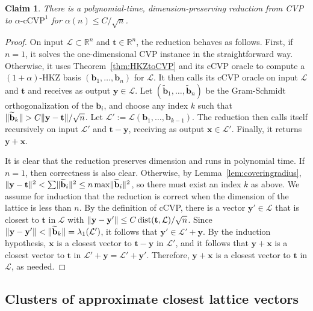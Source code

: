 \documentclass[11pt]{article}
\newtheorem{claim}[theorem]{Claim}
\newcommand{\R}{\ensuremath{\mathbb{R}}}
\renewcommand{\vec}[1]{\ensuremath{\mathbf{#1}}}
\newcommand{\problem}[1]{\mbox{#1}\xspace}
\newcommand{\lat}{\mathcal{L}}
\newcommand{\gs}[1]{\ensuremath{\widetilde{#1}}}
\DeclareMathOperator{\dist}{dist}
\DeclarePairedDelimiter\length{\lVert}{\rVert}
\begin{document}
\begin{claim}
\label{clm:simplenCVPreduction}
There is a polynomial-time, dimension-preserving reduction from \problem{CVP} to $\alpha\text{-}\problem{cCVP}^1$ for $\alpha(n) \leq C/\sqrt{n}$.
\end{claim}
\begin{proof}
On input $\lat \subset \R^n$ and $\vec{t} \in \R^n$, the reduction behaves as follows. First, if $n =1$, it solves the one-dimensional CVP instance in the straightforward way. Otherwise, it uses Theorem~\ref{thm:HKZtoCVP} and its cCVP oracle to compute a $(1+\alpha)$-HKZ basis $(\vec{b}_1, \ldots, \vec{b}_n)$ for $\lat$. It then calls its cCVP oracle on input $\lat$ and $\vec{t}$ and receives as output $\vec{y} \in \lat$. Let $(\gs{\vec{b}}_1, \ldots, \gs{\vec{b}}_n)$ be the Gram-Schmidt orthogonalization of the $\vec{b}_i$, and choose any index $k$ such that $ \length{\gs{\vec{b}}_k} > C\length{\vec{y} - \vec{t}}/\sqrt{n}$. Let $\lat' := \lat(\vec{b}_1,\ldots, \vec{b}_{k-1})$. The reduction then calls itself recursively on input $\lat'$ and $\vec{t} - \vec{y}$, receiving as output $\vec{x} \in \lat'$. Finally, it returns $\vec{y} + \vec{x}$.

It is clear that the reduction preserves dimension and runs in polynomial time. If $n = 1$, then correctness is also clear. Otherwise, by Lemma~\ref{lem:coveringradius}, 
$
\length{\vec{y} - \vec{t}}^2 < \sum \length{\gs{\vec{b}}_i}^2 \leq n \max \length{\gs{\vec{b}}_i}^2
$,
so there must exist an index $k$ as above. We assume for induction that the reduction is correct when the dimension of the lattice is less than $n$.  By the definition of cCVP, there is a vector $\vec{y}' \in \lat$ that is closest to $\vec{t}$ in $\lat$ with $\length{\vec{y} - \vec{y}'} \leq C \dist(\vec{t}, \lat)/\sqrt{n}$. Since $\length{\vec{y} - \vec{y}'} < \length{\gs{\vec{b}}_k} = \lambda_1(\lat')$, it follows that $\vec{y}' \in \lat' + \vec{y}$. 
By the induction hypothesis, $\vec{x}$ is a closest vector to $\vec{t} - \vec{y}$ in $\lat'$, and it follows that $\vec{y} + \vec{x}$ is a closest vector to $\vec{t}$ in $\lat' + \vec{y} = \lat' + \vec{y}'$. Therefore, $\vec{y} + \vec{x}$ is a closest vector to $\vec{t}$ in $\lat$, as needed.
\end{proof}

\subsection{Clusters of approximate closest lattice vectors}
\end{document}
